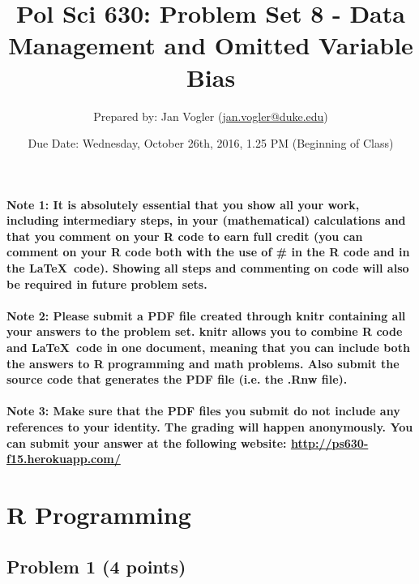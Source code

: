 \documentclass[12pt]{article}
\begin{document}
\title{Pol Sci 630: Problem Set 8 - Data Management and Omitted Variable Bias}

\author{Prepared by: Jan Vogler (\href{mailto:jan.vogler@duke.edu}{jan.vogler@duke.edu})}

\date{Due Date: Wednesday, October 26th, 2016, 1.25 PM (Beginning of Class)}
 
\maketitle 



\paragraph{Note 1: It is absolutely essential that you show all your work, including intermediary steps, in your (mathematical) calculations and that you comment on your R code to earn full credit (you can comment on your R code both with the use of \# in the R code and in the \LaTeX \ code). Showing all steps and commenting on code will also be required in future problem sets.}

\paragraph{Note 2: Please submit a PDF file created through knitr containing all your answers to the problem set. knitr allows you to combine R code and \LaTeX \ code in one document, meaning that you can include both the answers to R programming and math problems. Also submit the source code that generates the PDF file (i.e. the .Rnw file).}

\paragraph{Note 3: Make sure that the PDF files you submit do not include any references to your identity. The grading will happen anonymously. You can submit your answer at the following website: \url{http://ps630-f15.herokuapp.com/}}



\section*{R Programming}

\subsection*{Problem 1 (4 points)}
\end{document}
